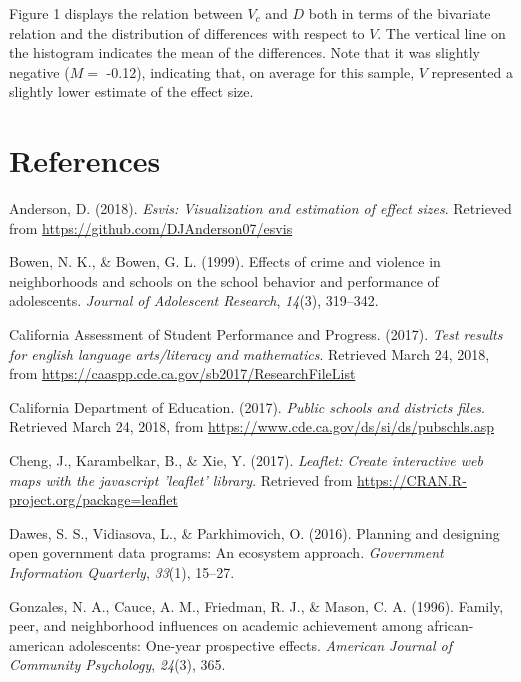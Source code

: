 \documentclass[man, fleqn, noextraspace]{apa6}
\theoremstyle{definition}
\theoremstyle{definition}
\theoremstyle{definition}
\theoremstyle{remark}
\begin{document}
Figure 1 displays the relation between \(V_c\) and \(D\) both in terms
of the bivariate relation and the distribution of differences with
respect to \(V\). The vertical line on the histogram indicates the mean
of the differences. Note that it was slightly negative (\(M =\) -0.12),
indicating that, on average for this sample, \(V\) represented a
slightly lower estimate of the effect size.

\newpage

\hypertarget{references}{%
\section{References}\label{references}}

\begingroup\setlength{\parindent}{-0.5in}\setlength{\leftskip}{0.25in}

\hypertarget{refs}{}
\leavevmode\hypertarget{ref-esvis}{}%
Anderson, D. (2018). \emph{Esvis: Visualization and estimation of effect
sizes}. Retrieved from \url{https://github.com/DJAnderson07/esvis}

\leavevmode\hypertarget{ref-bowen99}{}%
Bowen, N. K., \& Bowen, G. L. (1999). Effects of crime and violence in
neighborhoods and schools on the school behavior and performance of
adolescents. \emph{Journal of Adolescent Research}, \emph{14}(3),
319--342.

\leavevmode\hypertarget{ref-ca17a}{}%
California Assessment of Student Performance and Progress. (2017).
\emph{Test results for english language arts/literacy and mathematics}.
Retrieved March 24, 2018, from
\url{https://caaspp.cde.ca.gov/sb2017/ResearchFileList}

\leavevmode\hypertarget{ref-ca17b}{}%
California Department of Education. (2017). \emph{Public schools and
districts files}. Retrieved March 24, 2018, from
\url{https://www.cde.ca.gov/ds/si/ds/pubschls.asp}

\leavevmode\hypertarget{ref-leaflet}{}%
Cheng, J., Karambelkar, B., \& Xie, Y. (2017). \emph{Leaflet: Create
interactive web maps with the javascript 'leaflet' library}. Retrieved
from \url{https://CRAN.R-project.org/package=leaflet}

\leavevmode\hypertarget{ref-dawes16}{}%
Dawes, S. S., Vidiasova, L., \& Parkhimovich, O. (2016). Planning and
designing open government data programs: An ecosystem approach.
\emph{Government Information Quarterly}, \emph{33}(1), 15--27.

\leavevmode\hypertarget{ref-gonzales96}{}%
Gonzales, N. A., Cauce, A. M., Friedman, R. J., \& Mason, C. A. (1996).
Family, peer, and neighborhood influences on academic achievement among
african-american adolescents: One-year prospective effects.
\emph{American Journal of Community Psychology}, \emph{24}(3), 365.
\end{document}
